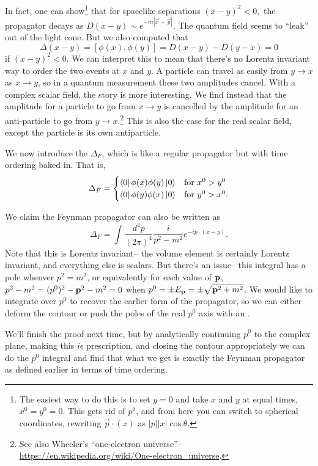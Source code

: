 In fact, one can show\footnote{The easiest way to do this is to set $y=0$ and take $x$ and $y$ at equal times, $x^0=y^0=0$. This gets rid of $p^0$, and from here you can switch to spherical coordinates, rewriting $\vec p \cdot (x)$ as $|p||x|\cos\theta$.} that for spacelike separations $(x-y)^2<0,$ the propagator decays as $D(x-y)\sim e^{-m|\vec x-\vec y|}.$ The quantum field seems to ``leak'' out of the light cone. But we also computed that
$$\Delta(x-y)=[\phi(x),\phi(y)] =D(x-y)-D(y-x)=0$$ if $(x-y)^2<0$. We can interpret this to mean that there's no Lorentz invariant way to order the two events at $x$ and $y$. A particle can travel as easily from $y\to x$ as $x\to y$, so in a quantum measurement these two amplitudes cancel. With a complex scalar field, the story is more interesting. We find instead that the amplitude for a particle to go from $x\to y$ is cancelled by the amplitude for an anti-particle to go from $y\to x$.\footnote{See also Wheeler's ``one-electron universe''-- \url{https://en.wikipedia.org/wiki/One-electron_universe}.} This is also the case for the real scalar field, except the particle is its own antiparticle.

\begin{defn}
We now introduce the  $\Delta_F$, which is like a regular propagator but with time ordering baked in. That is,
$$\Delta_F =\begin{cases}
  \left< 0 \right|\phi(x)\phi(y)\left| 0 \right> & \text{for } x^0 > y^0\\    
  \left< 0 \right|\phi(y)\phi(x)\left| 0 \right> & \text{for } y^0 > x^0.
\end{cases}$$
\end{defn}


We claim the Feynman propagator can also be written as
$$\Delta_F =\int \frac{d^4p}{(2\pi)^4}\frac{i}{p^2-m^2}e^{-ip\cdot (x-y)}.$$
Note that this is Lorentz invariant-- the volume element is certainly Lorentz invariant, and everything else is scalars. But there's an issue-- this integral has a pole whenver $p^2=m^2$, or equivalently for each value of $\boldsymbol{\mathbf{p}}$, $p^2-m^2=(p^0)^2-\boldsymbol{\mathbf{p}}^2-m^2=0$ when $p^0= \pm E_{\boldsymbol{\mathbf{p}}}=\pm \sqrt{ \boldsymbol{\mathbf{p}}^2+m^2}$. We would like to integrate over $p^0$ to recover the earlier form of the propagator, so we can either deform the contour or push the poles of the real $p^0$ axis with an .

We'll finish the proof next time, but by analytically continuing $p^0$ to the complex plane, making this $i\epsilon$ prescription, and closing the contour appropriately we can do the $p^0$ integral and find that what we get is exactly the Feynman propagator as defined earlier in terms of time ordering.

